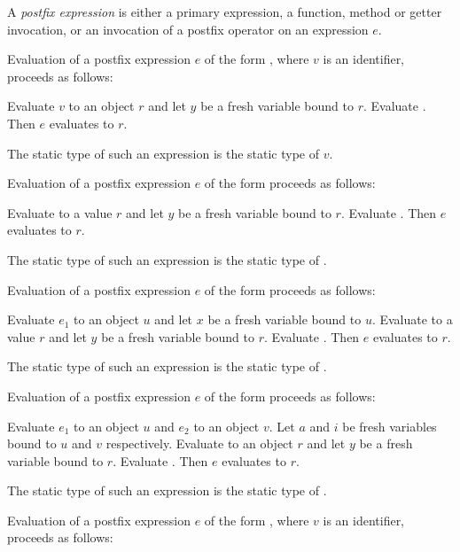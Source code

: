 \documentclass{article}
\begin{document}
\LMHash{}
 A {\em postfix expression} is either a primary expression, a function, method or getter invocation, or an invocation of a postfix operator on an expression $e$.

\LMHash{}
Evaluation of a postfix expression $e$ of the form , where $v$ is an identifier, proceeds as follows:

\LMHash{}
Evaluate $v$ to an object $r$ and let $y$ be a fresh variable bound to $r$.
Evaluate .
Then $e$ evaluates to $r$.

\LMHash{}
The static type of such an expression is the static type of $v$.


\LMHash{}
Evaluation of a postfix expression $e$ of the form 
proceeds as follows:

\LMHash{}
Evaluate  to a value $r$
and let $y$ be a fresh variable bound to $r$.
Evaluate .
Then $e$ evaluates to $r$.

\LMHash{}
The static type of such an expression is the static type of .

\LMHash{}
Evaluation of a postfix expression $e$ of the form 
proceeds as follows:

\LMHash{}
Evaluate $e_1$ to an object $u$ and let $x$ be a fresh variable bound to $u$.
Evaluate  to a value $r$
and let $y$ be a fresh variable bound to $r$.
Evaluate .
Then $e$ evaluates to $r$.

\LMHash{}
The static type of such an expression is the static type of .

\LMHash{}
Evaluation of a postfix expression $e$ of the form 
proceeds as follows:

\LMHash{}
Evaluate $e_1$ to an object $u$ and $e_2$ to an object $v$.
Let $a$ and $i$ be fresh variables bound to $u$ and $v$ respectively.
Evaluate  to an object $r$
and let $y$ be a fresh variable bound to $r$.
Evaluate .
Then $e$ evaluates to $r$.

\LMHash{}
The static type of such an expression is the static type of .

\LMHash{}
Evaluation of a postfix expression $e$ of the form , where $v$ is an identifier, proceeds as follows:
\end{document}
